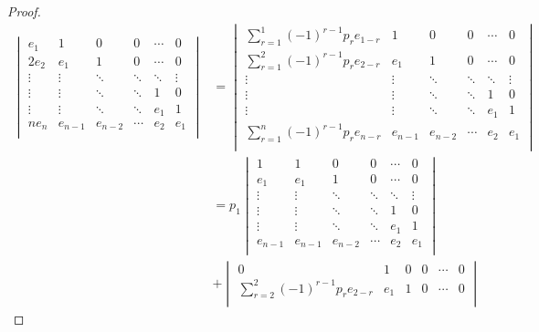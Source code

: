 \documentclass[8pt]{extarticle}
\newcommand{\<}{\langle}
\renewcommand{\>}{\rangle}
\theoremstyle{definition}
\begin{document}
\begin{proof}
  \begin{align*}
    \begin{vmatrix}
      e_1 & 1 & 0 & 0 & \cdots & 0 \\
      2e_2 & e_1 & 1 & 0 & \cdots & 0 \\
      \vdots & \vdots & \ddots & \ddots  & \ddots & \vdots \\
      \vdots & \vdots & \ddots & \ddots  & 1 & 0 \\
      \vdots & \vdots & \ddots & \ddots  & e_1 & 1 \\            
      ne_n & e_{n-1} & e_{n-2} & \cdots  & e_2 & e_1 \\            
    \end{vmatrix}
    &=
    \begin{vmatrix}
      \sum\limits_{r=1}^{1}(-1)^{r-1}p_r e_{1-r} & 1 & 0 & 0 & \cdots & 0 \\
      \sum\limits_{r=1}^{2}(-1)^{r-1}p_r e_{2-r} & e_1 & 1 & 0 & \cdots & 0 \\
      \vdots & \vdots & \ddots & \ddots  & \ddots & \vdots \\
      \vdots & \vdots & \ddots & \ddots  & 1 & 0 \\
      \vdots & \vdots & \ddots & \ddots  & e_1 & 1 \\            
      \sum\limits_{r=1}^{n}(-1)^{r-1}p_r e_{n-r} & e_{n-1} & e_{n-2} & \cdots  & e_2 & e_1 \\            
    \end{vmatrix}    \\
    &=p_1
    \begin{vmatrix}
      1 & 1 & 0 & 0 & \cdots & 0 \\
      e_1 & e_1 & 1 & 0 & \cdots & 0 \\
      \vdots & \vdots & \ddots & \ddots  & \ddots & \vdots \\
      \vdots & \vdots & \ddots & \ddots  & 1 & 0 \\
      \vdots & \vdots & \ddots & \ddots  & e_1 & 1 \\            
      e_{n-1} & e_{n-1} & e_{n-2} & \cdots  & e_2 & e_1 \\
    \end{vmatrix} \\
    &+
    \begin{vmatrix}
      0 & 1 & 0 & 0 & \cdots & 0 \\
      \sum\limits_{r=2}^{2}(-1)^{r-1}p_r e_{2-r} & e_1 & 1 & 0 & \cdots & 0 \\

\end{vmatrix}
\end{align*}
\end{proof}
\end{document}
